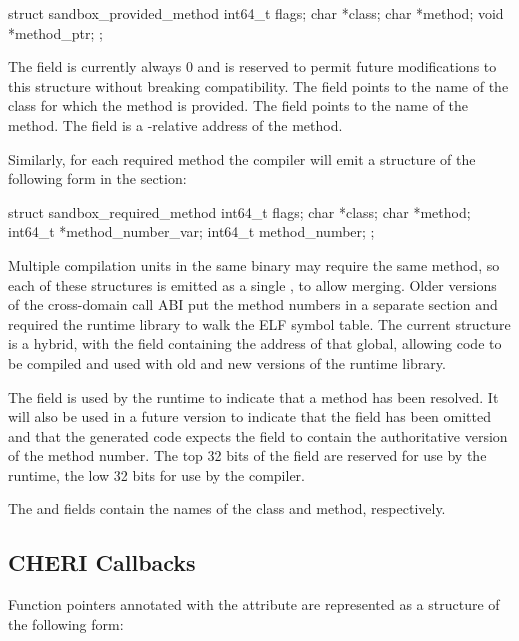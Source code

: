 \begin{csnippet}
struct sandbox_provided_method
{
	int64_t   flags;
	char     *class;
	char     *method;
	void     *method_ptr;
};
\end{csnippet}

The  field is currently always 0 and is reserved to permit future modifications to this structure without breaking compatibility.
The  field points to the name of the class for which the method is provided.
The  field points to the name of the method.
The  field is a -relative address of the method.

Similarly, for each required method the compiler will emit a structure of the following form in the  section:

\begin{csnippet}
struct sandbox_required_method
{
	int64_t   flags;
	char     *class;
	char     *method;
	int64_t  *method_number_var;
	int64_t   method_number;
};
\end{csnippet}

Multiple compilation units in the same binary may require the same method, so each of these structures is emitted as a single , to allow merging.
Older versions of the cross-domain call ABI put the method numbers in a separate section and required the runtime library to walk the ELF symbol table.
The current structure is a hybrid, with the  field containing the address of that global, allowing code to be compiled and used with old and new versions of the runtime library.

The  field is used by the runtime to indicate that a method has been resolved.
It will also be used in a future version to indicate that the  field has been omitted and that the generated code expects the  field to contain the authoritative version of the method number.
The top 32 bits of the  field are reserved for use by the runtime, the low 32 bits for use by the compiler.

The  and  fields contain the names of the class and method, respectively.

\subsection{CHERI Callbacks}

Function pointers annotated with the  attribute are represented as a structure of the following form:

